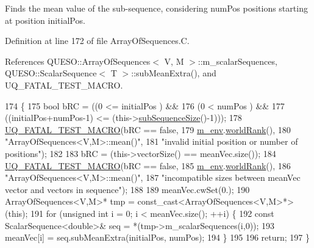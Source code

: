 Finds the mean value of the sub-\/sequence, considering {\ttfamily num\-Pos} positions starting at position {\ttfamily initial\-Pos}. 



Definition at line 172 of file Array\-Of\-Sequences.\-C.



References Q\-U\-E\-S\-O\-::\-Array\-Of\-Sequences$<$ V, M $>$\-::m\-\_\-scalar\-Sequences, Q\-U\-E\-S\-O\-::\-Scalar\-Sequence$<$ T $>$\-::sub\-Mean\-Extra(), and U\-Q\-\_\-\-F\-A\-T\-A\-L\-\_\-\-T\-E\-S\-T\-\_\-\-M\-A\-C\-R\-O.


\begin{DoxyCode}
174 \{
175   \textcolor{keywordtype}{bool} bRC = ((0                     <= initialPos                 ) &&
176               (0                     <  numPos                     ) &&
177               ((initialPos+numPos-1) <= (this->\hyperlink{class_q_u_e_s_o_1_1_array_of_sequences_a007d00d2398007b9bac82ed23eedb1e2}{subSequenceSize}()-1)));
178   \hyperlink{_defines_8h_a56d63d18d0a6d45757de47fcc06f574d}{UQ\_FATAL\_TEST\_MACRO}(bRC == \textcolor{keyword}{false},
179                       \hyperlink{class_q_u_e_s_o_1_1_base_vector_sequence_a8e8824d2a63c5a43bcc6473e3a0491e8}{m\_env}.\hyperlink{class_q_u_e_s_o_1_1_base_environment_a78b57112bbd0e6dd0e8afec00b40ffa7}{worldRank}(),
180                       \textcolor{stringliteral}{"ArrayOfSequences<V,M>::mean()"},
181                       \textcolor{stringliteral}{"invalid initial position or number of positions"});
182 
183   bRC = (this->vectorSize() == meanVec.size());
184   \hyperlink{_defines_8h_a56d63d18d0a6d45757de47fcc06f574d}{UQ\_FATAL\_TEST\_MACRO}(bRC == \textcolor{keyword}{false},
185                       \hyperlink{class_q_u_e_s_o_1_1_base_vector_sequence_a8e8824d2a63c5a43bcc6473e3a0491e8}{m\_env}.\hyperlink{class_q_u_e_s_o_1_1_base_environment_a78b57112bbd0e6dd0e8afec00b40ffa7}{worldRank}(),
186                       \textcolor{stringliteral}{"ArrayOfSequences<V,M>::mean()"},
187                       \textcolor{stringliteral}{"incompatible sizes between meanVec vector and vectors in sequence"});
188 
189   meanVec.cwSet(0.);
190   ArrayOfSequences<V,M>* tmp = \textcolor{keyword}{const\_cast<}ArrayOfSequences<V,M>*\textcolor{keyword}{>}(\textcolor{keyword}{this});
191   \textcolor{keywordflow}{for} (\textcolor{keywordtype}{unsigned} \textcolor{keywordtype}{int} i = 0; i < meanVec.size(); ++i) \{
192     \textcolor{keyword}{const} ScalarSequence<double>& seq = *(tmp->m\_scalarSequences(i,0));
193     meanVec[i] = seq.subMeanExtra(initialPos, numPos);
194   \}
195 
196   \textcolor{keywordflow}{return};
197 \}
\end{DoxyCode}
